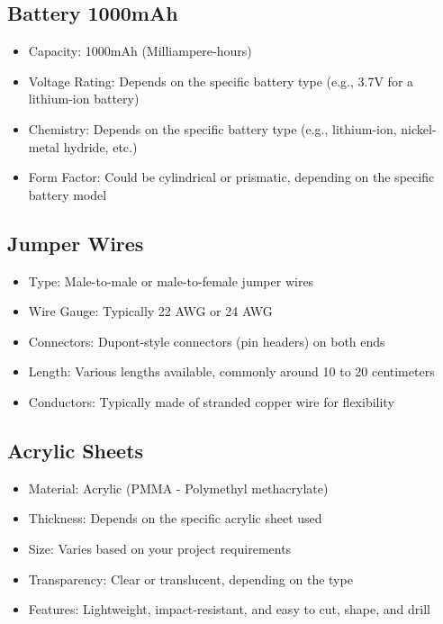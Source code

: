\documentclass[a4paper,12pt,oneside]{book}
\begin{document}
\subsection*{Battery 1000mAh}
\begin{itemize}
  \item Capacity: 1000mAh (Milliampere-hours)
  \item Voltage Rating: Depends on the specific battery type (e.g., 3.7V for a lithium-ion battery)
  \item Chemistry: Depends on the specific battery type (e.g., lithium-ion, nickel-metal hydride, etc.)
  \item Form Factor: Could be cylindrical or prismatic, depending on the specific battery model
\end{itemize}

\subsection*{Jumper Wires}
\begin{itemize}
  \item Type: Male-to-male or male-to-female jumper wires
  \item Wire Gauge: Typically 22 AWG or 24 AWG
  \item Connectors: Dupont-style connectors (pin headers) on both ends
  \item Length: Various lengths available, commonly around 10 to 20 centimeters
  \item Conductors: Typically made of stranded copper wire for flexibility
\end{itemize}

\subsection*{Acrylic Sheets}
\begin{itemize}
  \item Material: Acrylic (PMMA - Polymethyl methacrylate)
  \item Thickness: Depends on the specific acrylic sheet used
  \item Size: Varies based on your project requirements
  \item Transparency: Clear or translucent, depending on the type
  \item Features: Lightweight, impact-resistant, and easy to cut, shape, and drill
\end{itemize}
\end{document}
